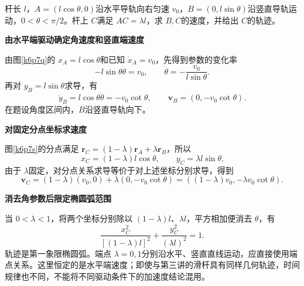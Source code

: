 \begin{question}\begin{example}[水平端匀速的滑杆]\label{k6p7}
杆长 $l$，$A=(l\cos\theta,0)$沿水平导轨向右匀速 $v_0$，$B=(0,l\sin\theta)$沿竖直导轨运动，$0<\theta<\pi/2$。杆上 $C$满足 $AC=\lambda l$，求 $B,C$的速度，并给出 $C$的轨迹。\end{example}
\end{question}
\begin{solution}\textbf{由水平端驱动确定角速度和竖直端速度}\par\nobreak
由图\ref{k6p7q}的 $x_A=l\cos\theta$和已知 $\dot x_A=v_0$，先得到参数的变化率
\[-l\sin\theta\dot\theta=v_0,\qquad
\dot\theta=-\frac{v_0}{l\sin\theta}.\]
再对 $y_B=l\sin\theta$求导，有
\[\dot y_B=l\cos\theta\dot\theta=-v_0\cot\theta,
\qquad\boxed{\bm v_B=(0,-v_0\cot\theta)}.\]
在题设角度区间内，$B$沿竖直导轨向下。



\par\medskip{}\noindent\textbf{对固定分点坐标求速度}\par\nobreak
图\ref{k6p7s}的分点满足 $\bm r_C=(1-\lambda)\bm r_A+\lambda\bm r_B$，所以
\[x_C=(1-\lambda)l\cos\theta,\qquad
y_C=\lambda l\sin\theta.\]
由于 $\lambda$固定，对分点关系求导等价于对上述坐标分别求导，得到
\[\bm v_C=(1-\lambda)(v_0,0)+\lambda(0,-v_0\cot\theta)
 =\boxed{((1-\lambda)v_0,-\lambda v_0\cot\theta)}.\]


\par\medskip{}\noindent\textbf{消去角参数后限定椭圆弧范围}\par\nobreak
当 $0<\lambda<1$，将两个坐标分别除以 $(1-\lambda)l$、$\lambda l$，平方相加便消去 $\theta$，有
\[\boxed{\frac{x_C^2}{[(1-\lambda)l]^2}
       +\frac{y_C^2}{(\lambda l)^2}=1}.\]
轨迹是第一象限椭圆弧。端点 $\lambda=0,1$分别沿水平、竖直直线运动，应直接使用端点关系。这里恒定的是水平端速度；即使与第三讲的滑杆具有同样几何轨迹，时间规律也不同，不能将不同驱动条件下的加速度结论混用。\end{solution}


